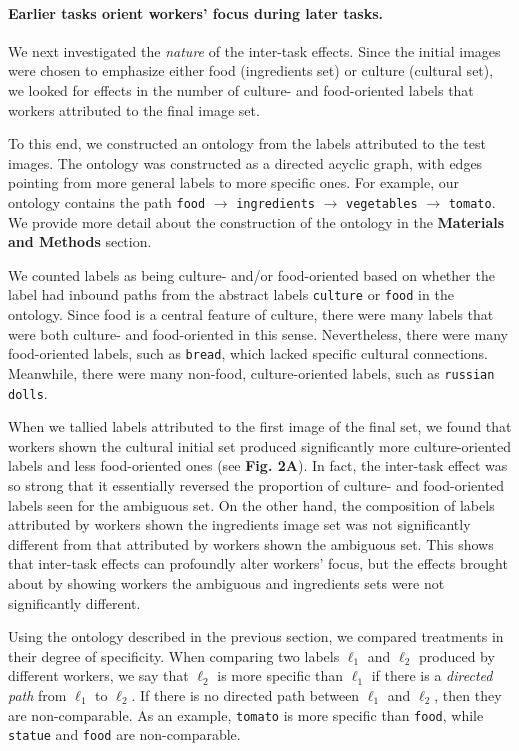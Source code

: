 \documentclass[letterpaper,twocolumn]{article}
\begin{document}
\paragraph{Earlier tasks orient workers' focus during later tasks.} 
We next investigated the \textit{nature} of the inter-task effects.  Since the
initial images were chosen to emphasize either food (ingredients set) or 
culture (cultural set), we looked for effects in the number of culture- and 
food-oriented labels that workers attributed to the final image set.

To this end, we constructed an ontology from the labels attributed to the 
test images.  The ontology was constructed as a directed acyclic graph, with 
edges pointing from more general labels to more specific ones.
For example, our ontology contains the path \texttt{food} $\to$ 
\texttt{ingredients} $\to$ \texttt{vegetables} $\to$ \texttt{tomato}. We 
provide more detail about the construction of the ontology in the 
\textbf{Materials and Methods} section.

We counted labels as being culture- and/or food-oriented based on 
whether the label had inbound paths from the abstract labels \texttt{culture} 
or \texttt{food} in the ontology. Since food is a central feature 
of culture, there were many labels that were both culture- and food-oriented 
in this sense.  Nevertheless, there were many food-oriented labels, such as 
\texttt{bread}, which lacked specific cultural connections.  Meanwhile, there 
were many non-food, culture-oriented labels, such as \texttt{russian dolls}. 

When we tallied labels attributed to the first image of the final set, 
we found that workers shown the cultural initial set produced significantly 
more culture-oriented labels and less food-oriented ones 
(see \textbf{Fig. 2A}).  In fact, the inter-task
effect was so strong that it essentially reversed the proportion of culture- 
and food-oriented labels seen for the ambiguous set.  On the other hand, the 
composition of labels attributed by 
workers shown the ingredients image set was not significantly different from 
that attributed by workers shown the ambiguous set.  This shows that inter-task
effects can profoundly alter workers' focus, but the effects brought 
about by showing workers the ambiguous and ingredients sets were not 
significantly different.




Using the ontology described in the previous section, we compared treatments 
in their degree of specificity.  When comparing two labels $\ell_1$ and 
$\ell_2$ produced by different workers, we say that $\ell_2$ is more specific 
than $\ell_1$ if there is a \textit{directed path} from $\ell_1$ to $\ell_2$.  
If there is no directed path between $\ell_1$ and $\ell_2$, then they are 
non-comparable.  As an example, \texttt{tomato} is more specific than 
\texttt{food}, while \texttt{statue} and \texttt{food} are non-comparable.
\end{document}
